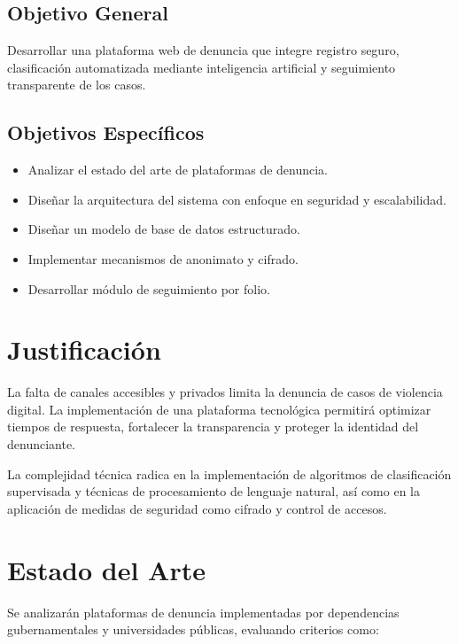 \documentclass[12pt,oneside]{report}
\begin{document}
\section{Objetivo General}

Desarrollar una plataforma web de denuncia que integre registro seguro, clasificación automatizada mediante inteligencia artificial y seguimiento transparente de los casos.

\section{Objetivos Específicos}

\begin{itemize}
    \item Analizar el estado del arte de plataformas de denuncia.
    \item Diseñar la arquitectura del sistema con enfoque en seguridad y escalabilidad.
    \item Diseñar un modelo de base de datos estructurado.
    \item Implementar mecanismos de anonimato y cifrado.
    \item Desarrollar módulo de seguimiento por folio.
\end{itemize}

\chapter{Justificación}

La falta de canales accesibles y privados limita la denuncia de casos de violencia digital. La implementación de una plataforma tecnológica permitirá optimizar tiempos de respuesta, fortalecer la transparencia y proteger la identidad del denunciante.

La complejidad técnica radica en la implementación de algoritmos de clasificación supervisada y técnicas de procesamiento de lenguaje natural, así como en la aplicación de medidas de seguridad como cifrado y control de accesos.

\chapter{Estado del Arte}

Se analizarán plataformas de denuncia implementadas por dependencias gubernamentales y universidades públicas, evaluando criterios como:
\end{document}

